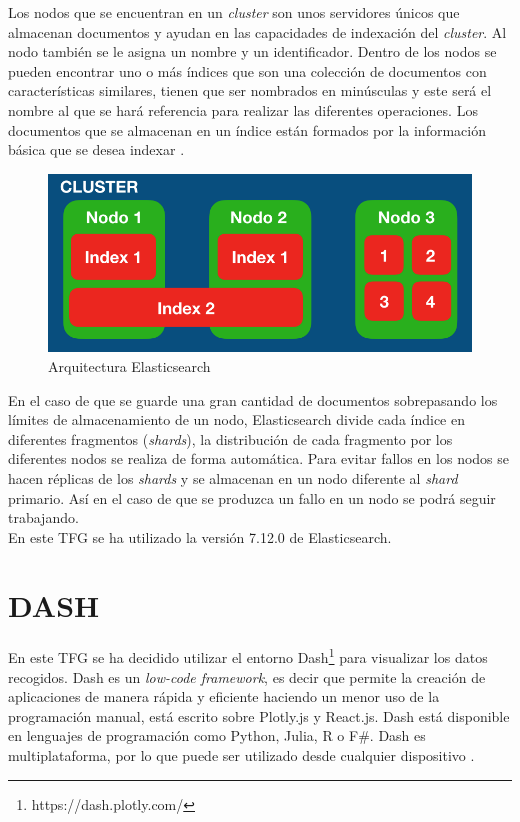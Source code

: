 Los nodos que se encuentran en un \textit{cluster} son unos servidores únicos que almacenan documentos y ayudan en las capacidades de indexación del \textit{cluster}. Al nodo también se le asigna un nombre y un identificador. Dentro de los nodos se pueden encontrar uno o más índices que son una colección de documentos con características similares, tienen que ser nombrados en minúsculas y este será el nombre al que se hará referencia para realizar las diferentes operaciones. Los documentos que se almacenan en un índice están formados por la información básica que se desea indexar \cite{elastic3}.\\



\begin{figure}[H]
    \centering
    \includegraphics[width=12cm, keepaspectratio]{img/arquitectura_elastic.png}
    \caption{Arquitectura Elasticsearch}
    \label{fig:elastic}
\end{figure}
En el caso de que se guarde una gran cantidad de documentos sobrepasando los límites de almacenamiento de un nodo, Elasticsearch divide cada índice en diferentes fragmentos (\textit{shards}), la distribución de cada fragmento por los diferentes nodos se realiza de forma automática. Para evitar fallos en los nodos se hacen réplicas de los \textit{shards} y se almacenan en un nodo diferente al \textit{shard} primario. Así en el caso de que se produzca un fallo en un nodo se podrá seguir trabajando.\\

En este TFG se ha utilizado la versión 7.12.0 de Elasticsearch.


\section{DASH}

En este TFG se ha decidido utilizar el entorno Dash\footnote{https://dash.plotly.com/} para visualizar los datos recogidos. Dash es un \textit{low-code framework}, es decir que permite la creación de aplicaciones de manera rápida y eficiente haciendo un menor uso de la programación manual, está escrito sobre Plotly.js y React.js. Dash está disponible en lenguajes de programación como Python, Julia, R o F#. Dash es multiplataforma, por lo que puede ser utilizado desde cualquier dispositivo \cite{dash}.\\

